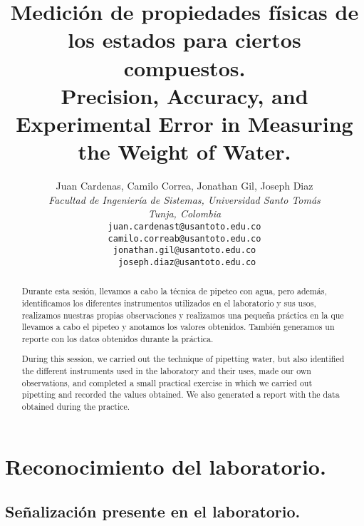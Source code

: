 \documentclass[letterpaper]{IEEEconf}
\title{\LARGE %
Medición de propiedades físicas de los estados para ciertos compuestos.\\
\foreignlanguage{english}{Precision, Accuracy, and Experimental Error in Measuring the Weight of Water.}
}
\author{
Juan Cardenas, Camilo Correa, Jonathan Gil, Joseph Diaz\\
\emph{Facultad de Ingeniería de Sistemas, Universidad Santo Tomás}\\
\emph{Tunja, Colombia}\\
\texttt{juan.cardenast@usantoto.edu.co}\\
\texttt{camilo.correab@usantoto.edu.co}\\
\texttt{jonathan.gil@usantoto.edu.co}\\
\texttt{ joseph.diaz@usantoto.edu.co}\\
}
\date{} %
\begin{document}
\maketitle

\begin{abstract}
\textnormal{Durante esta sesión, llevamos a cabo la técnica de pipeteo con agua, pero además, identificamos los diferentes instrumentos utilizados en el laboratorio y sus usos, realizamos nuestras propias observaciones y realizamos una pequeña práctica en la que llevamos a cabo el pipeteo y anotamos los valores obtenidos. También generamos un reporte con los datos obtenidos durante la práctica.}
\end{abstract}

\begin{otherlanguage}{english}
\begin{abstract}
\textnormal{During this session, we carried out the technique of pipetting water, but also identified the different instruments used in the laboratory and their uses, made our own observations, and completed a small practical exercise in which we carried out pipetting and recorded the values obtained. We also generated a report with the data obtained during the practice.}
\end{abstract}
\end{otherlanguage}

\section{Reconocimiento del laboratorio.}
\subsection{Señalización presente en el laboratorio. \cite{Seglab}}
\end{document}
